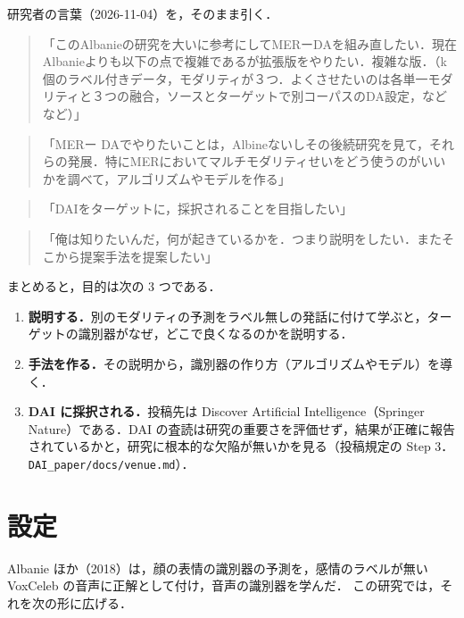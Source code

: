 \documentclass[11pt,a4paper]{ltjsarticle}
\newcommand{\voice}[1]{\begin{quote}\small 「#1」\end{quote}}
\begin{document}
研究者の言葉（2026-11-04）を，そのまま引く．

\voice{このAlbanieの研究を大いに参考にしてMERーDAを組み直したい．現在Albanieよりも以下の点で複雑であるが拡張版をやりたい．複雑な版．（k個のラベル付きデータ，モダリティが３つ．よくさせたいのは各単一モダリティと３つの融合，ソースとターゲットで別コーパスのDA設定，などなど）}

\voice{MERー DAでやりたいことは，Albineないしその後続研究を見て，それらの発展．特にMERにおいてマルチモダリティせいをどう使うのがいいかを調べて，アルゴリズムやモデルを作る}

\voice{DAIをターゲットに，採択されることを目指したい}

\voice{俺は知りたいんだ，何が起きているかを．つまり説明をしたい．またそこから提案手法を提案したい}

まとめると，目的は次の 3 つである．
\begin{enumerate}
  \item \textbf{説明する．}別のモダリティの予測をラベル無しの発話に付けて学ぶと，ターゲットの識別器がなぜ，どこで良くなるのかを説明する．
  \item \textbf{手法を作る．}その説明から，識別器の作り方（アルゴリズムやモデル）を導く．
  \item \textbf{DAI に採択される．}投稿先は Discover Artificial Intelligence（Springer Nature）である．DAI の査読は研究の重要さを評価せず，結果が正確に報告されているかと，研究に根本的な欠陥が無いかを見る（投稿規定の Step 3．\texttt{DAI\_paper/docs/venue.md}）．
\end{enumerate}

\section{設定}

Albanie ほか（2018）は，顔の表情の識別器の予測を，感情のラベルが無い VoxCeleb の音声に正解として付け，音声の識別器を学んだ．
この研究では，それを次の形に広げる．
\end{document}
